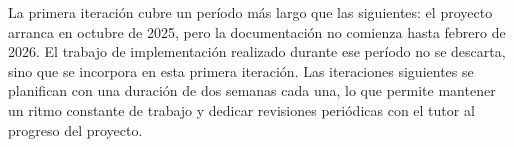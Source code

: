 La primera iteración cubre un período más largo que las siguientes: el proyecto arranca en octubre de 2025, pero la documentación no comienza hasta febrero de 2026. El trabajo de implementación realizado durante ese período no se descarta, sino que se incorpora en esta primera iteración. Las iteraciones siguientes se planifican con una duración de dos semanas cada una, lo que permite mantener un ritmo constante de trabajo y dedicar revisiones periódicas con el tutor al progreso del proyecto.


